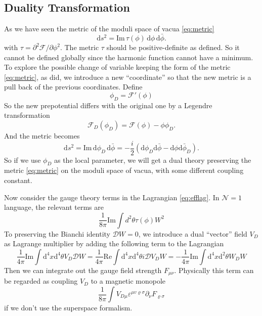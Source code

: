 \documentclass{article}
\begin{document}
\subsection{Duality Transformation}
\label{sec:duality}
As we have seen the metric of the moduli space of vacua \eqref{eq:metric}
\begin{equation}
    \mathrm{d}s^2=\mathrm{Im}\,\tau(\phi)\,\mathrm{d}\phi\,\mathrm{d}\bar{\phi}.
\end{equation}
with $\tau=\partial^2 \mathscr{F}/\partial\phi^2$. The metric $\tau$ should be positive-definite as defined. So it cannot be defined globally since the harmonic function cannot have a minimum. To explore the possible change of variable keeping the form of the metric \eqref{eq:metric}, as \cite{Sei94} did, we introduce a new ``coordinate'' so that the new metric is a pull back of the previous coordinates. Define
\begin{equation}
    \phi_D=\mathscr{F}'(\phi)
\end{equation}
So the new prepotential differs with the original one by a Legendre transformation
\begin{equation}
    \mathscr{F}_D(\phi_D)=\mathscr{F}(\phi)-\phi\phi_D.
\end{equation}
And the metric becomes
\begin{equation}
\label{eq:metric2}
    \mathrm{d}s^2=\mathrm{Im}\,\mathrm{d}\phi_D\,\mathrm{d}\bar{\phi}=-\frac{i}{2}\left(\mathrm{d}\phi_{D} \mathrm{d}\bar{\phi}-\mathrm{d}\phi \mathrm{d}\bar{\phi}_{D}\right).
\end{equation}
So if we use $\phi_D$ as the local parameter, we will get a dual theory preserving the metric \eqref{eq:metric} on the moduli space of vacua, with some different coupling constant.

Now consider the gauge theory terms in the Lagrangian \eqref{eq:efflag}. In $\mathcal{N}=1$ language, the relevant terms are 
\begin{equation}
\frac{1}{8 \pi} \mathrm{Im} \int d^{2} \theta \tau(\phi) W^{2}
\end{equation}
To preserving the Bianchi identity $\mathscr{D}W=0$, we introduce a dual ``vector'' field $V_D$ as Lagrange multiplier by adding the following term to the Lagrangian
\begin{equation}
\label{eq:multi}
\frac{1}{4 \pi} \mathrm{Im} \int \mathrm{d}^{4} x \mathrm{d}^{4} \theta V_{D} \mathscr{D} W=\frac{1}{4 \pi} \mathrm{Re} \int \mathrm{d}^{4} x \mathrm{d}^{4} \theta i \mathscr{D} V_{D} W=-\frac{1}{4 \pi} \mathrm{Im} \int \mathrm{d}^{4} x \mathrm{d}^{2} \theta W_{D} W
\end{equation}
Then we can integrate out the gauge field strength $F_{\mu\nu}$. Physically this term can be regarded as coupling $V_D$ to a magnetic monopole 
\begin{equation}
\frac{1}{8 \pi} \int V_{D \mu} \varepsilon^{\mu v \varrho \sigma} \partial_{\nu} F_{\varrho \sigma}
\end{equation}
if we don't use the superspace formalism.
\end{document}

